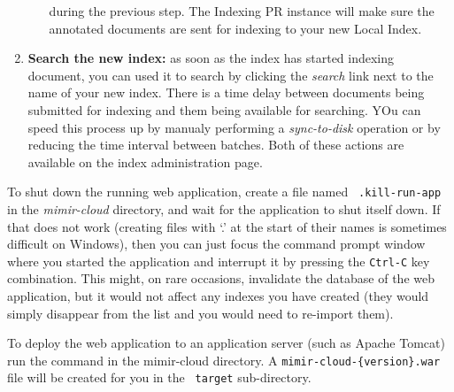 \begin{enumerate}
\begin{enumerate}
    during the previous step. The \Mimir{} Indexing PR instance will make
    sure the annotated documents are sent for indexing to your new Local Index.
  \end{enumerate}
  \item {\bf Search the new index:} as soon as the index has started indexing
  document, you can used it to search by clicking the {\em search} link next to
  the name of your new index. There is a time delay between documents being
  submitted for indexing and them being available for searching. YOu can speed
  this process up by manualy performing a {\em sync-to-disk} operation or by
  reducing the time interval between batches. Both of these actions are
  available on the index administration page.
\end{enumerate}

To shut down the running web application, create a file named {\tt
.kill-run-app} in the {\em mimir-cloud} directory, and wait for the application
to shut itself down. If that does not work (creating files with `.' at the start
of their names is sometimes difficult on Windows), then you can just focus the
command prompt window where you started the application and interrupt it by
pressing the {\tt Ctrl-C} key combination. This might, on rare occasions,
invalidate the database of the \Mimir{} web application, but it would not affect
any indexes you have created (they would simply disappear from the list and
you would need to re-import them).

To deploy the \Mimir{} web application to an application server (such as Apache
Tomcat) run the  command in the mimir-cloud directory. A
{\tt mimir-cloud-\{version\}.war} file will be created for you in the {\tt
target} sub-directory.